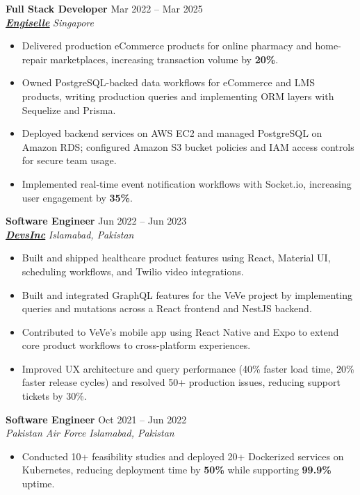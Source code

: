 \documentclass[9pt,letterpaper]{article}
\newcommand{\role}[4]{\textbf{#1} \hfill #2 \\
\textit{#3} \hfill \textit{#4}\\[-4pt]}
\begin{document}
\role{Full Stack Developer}{Mar 2022 -- Mar 2025}{\href{https://www.engiselle.com/}{\textbf{\underline{Engiselle}}}}{Singapore}
\begin{itemize}[leftmargin=*, itemsep=0pt, topsep=0pt, partopsep=0pt, parsep=0pt, after=\vspace{2pt}]
  \item Delivered production eCommerce products for online pharmacy and home-repair marketplaces, increasing transaction volume by \textbf{20\%}.
  \item Owned PostgreSQL-backed data workflows for eCommerce and LMS products, writing production queries and implementing ORM layers with Sequelize and Prisma.
  \item Deployed backend services on AWS EC2 and managed PostgreSQL on Amazon RDS; configured Amazon S3 bucket policies and IAM access controls for secure team usage.
  \item Implemented real-time event notification workflows with Socket.io, increasing user engagement by \textbf{35\%}.
\end{itemize}

\role{Software Engineer}{Jun 2022 -- Jun 2023}{\href{https://www.devsinc.com/}{\textbf{\underline{DevsInc}}}}{Islamabad, Pakistan}
\begin{itemize}[leftmargin=*, itemsep=0pt, topsep=0pt, partopsep=0pt, parsep=0pt, after=\vspace{2pt}]
  \item Built and shipped healthcare product features using React, Material UI, scheduling workflows, and Twilio video integrations.
  \item Built and integrated GraphQL features for the VeVe project by implementing queries and mutations across a React frontend and NestJS backend.
  \item Contributed to VeVe's mobile app using React Native and Expo to extend core product workflows to cross-platform experiences.
  \item Improved UX architecture and query performance (40\% faster load time, 20\% faster release cycles) and resolved 50+ production issues, reducing support tickets by 30\%.
\end{itemize}

\role{Software Engineer}{Oct 2021 -- Jun 2022}{Pakistan Air Force}{Islamabad, Pakistan}
\begin{itemize}[leftmargin=*, itemsep=0pt, topsep=0pt, partopsep=0pt, parsep=0pt, after=\vspace{2pt}]
  \item Conducted 10+ feasibility studies and deployed 20+ Dockerized services on Kubernetes, reducing deployment time by \textbf{50\%} while supporting \textbf{99.9\%} uptime.
\end{itemize}
\end{document}
